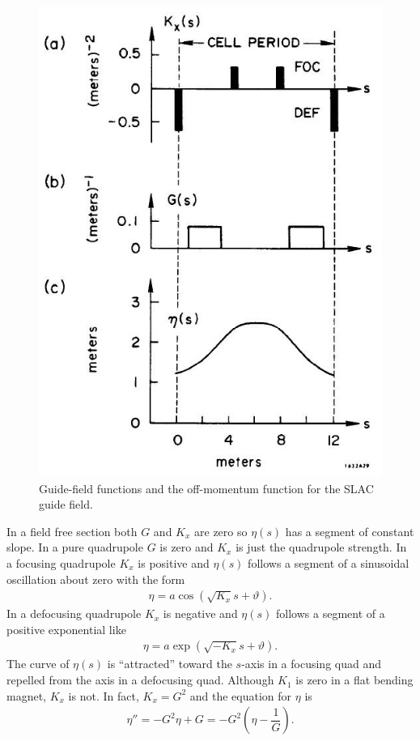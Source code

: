 \begin{figure}[!htb]
	\centering
	\includegraphics[width=0.8\linewidth]{./Figuras/fig29.jpeg}
	\caption{Guide-field functions and the off-momentum function for the SLAC guide field.}
	\label{fig:fig29}
\end{figure}
In a field free section both $G$ and $K_x$ are zero so $\eta(s)$ has a segment of constant
slope. In a pure quadrupole $G$ is zero and $K_x$ is just the quadrupole strength. In
a focusing quadrupole $K_x$ is positive and $\eta(s)$ follows a segment of a sinusoidal
oscillation about zero with the form
\begin{align*}
	\eta = a \cos(\sqrt{K_x}s + \vartheta).
\end{align*}
In a defocusing quadrupole $K_x$ is negative and $\eta(s)$ follows a segment of a positive
exponential like
\begin{align*}
	\eta = a \exp(\sqrt{-K_x}s+\vartheta).
\end{align*}
The curve of $\eta(s)$ is ``attracted'' toward the $s$-axis in a focusing quad and repelled
from the axis in a defocusing quad.
Although $K_1$ is zero in a flat bending magnet, $K_x$ is not. In fact, $K_x = G^2$ and
the equation for $\eta$ is
\begin{align}
	\eta'' = -G^2\eta + G = -G^2\left( \eta - \dfrac{1}{G} \right).
\end{align}
